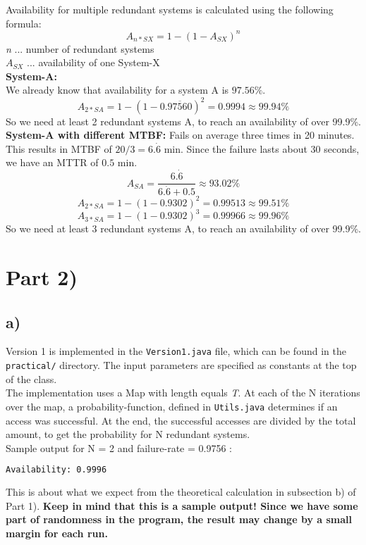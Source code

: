 \documentclass{article}
\begin{document}
    Availability for multiple redundant systems is calculated using the following formula:\\
    \begin{equation}
      A_{n*SX} = 1 - (1 - A_{SX})^{n}
    \end{equation}
    \textit{n} ... number of redundant systems\\
    $A_{SX}$ ... availability of one System-X\\
    \newline
    \textbf{System-A:}\\
    We already know that availability for a system A is $97.56 \%$.\\
    \[ A_{2*SA} = 1 - (1 - 0.\overline{97560})^{2} = 0.9994 \approx 99.94 \% \]
    So we need at least 2 redundant systems A, to reach an availability of over 99.9\%.\\
    \newline
    \textbf{System-A with different MTBF:}
    Fails on average three times in 20 minutes. This results in MTBF of $20/3 = 6.\dot{6}$ min. Since the failure lasts about 30 seconds, we have an MTTR of $0.5$ min.\\
    \[ A_{SA} = \frac{6.\dot{6}}{6.\dot{6}+0.5} \approx 93.02 \% \]
    \[ A_{2*SA} = 1 - (1 - 0.9302)^{2} = 0.99513 \approx 99.51 \% \]
    \[ A_{3*SA} = 1 - (1 - 0.9302)^{3} = 0.99966 \approx 99.96 \% \]
    So we need at least 3 redundant systems A, to reach an availability of over 99.9\%.\\
    
  \section*{Part 2)}
    \subsection*{a)}
    
      Version 1 is implemented in the \texttt{Version1.java} file, which can be found in the \texttt{practical/} directory. The input parameters are specified as constants at the top of the class.\\
      The implementation uses a Map with length equals \textit{T}. At each of the N iterations over the map, a probability-function, defined in \texttt{Utils.java} determines if an access was successful. At the end, the successful accesses are divided by the total amount, to get the probability for N redundant systems.\\
      \newline
      Sample output for N = 2 and failure-rate = 0.9756 :
      \begin{lstlisting}[language=sh]
        Availability: 0.9996
      \end{lstlisting}
      This is about what we expect from the theoretical calculation in subsection b) of Part 1). \textbf{Keep in mind that this is a sample output! Since we have some part of randomness in the program, the result may change by a small margin for each run.}\\
      
\end{document}
